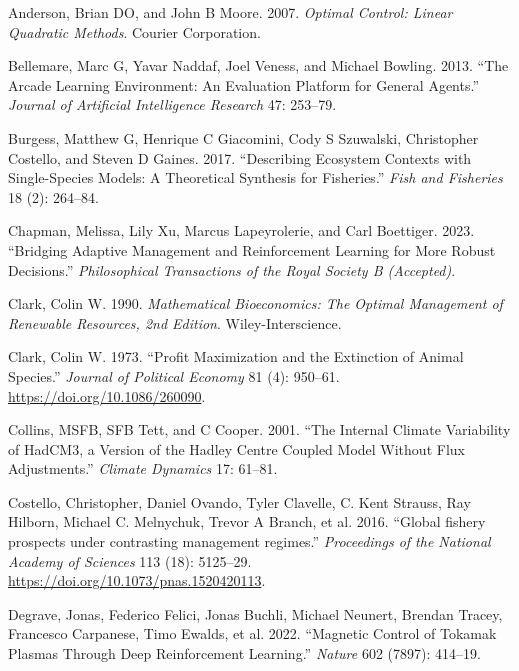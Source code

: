 \documentclass{article}
\newlength{\cslhangindent}
\newlength{\cslentryspacingunit} %
\newenvironment{CSLReferences}[2] %
 {%
  \setlength{\parindent}{0pt}
  \ifodd #1
  \let\oldpar\par
  \def\par{\hangindent=\cslhangindent\oldpar}
  \fi
  \setlength{\parskip}{#2\cslentryspacingunit}
 }%
 {}
\begin{document}
\hypertarget{refs}{}
\begin{CSLReferences}{1}{0}
\leavevmode{}%
Anderson, Brian DO, and John B Moore. 2007. \emph{Optimal Control:
Linear Quadratic Methods}. Courier Corporation.

\leavevmode{}%
Bellemare, Marc G, Yavar Naddaf, Joel Veness, and Michael Bowling. 2013.
{``The Arcade Learning Environment: An Evaluation Platform for General
Agents.''} \emph{Journal of Artificial Intelligence Research} 47:
253--79.

\leavevmode{}%
Burgess, Matthew G, Henrique C Giacomini, Cody S Szuwalski, Christopher
Costello, and Steven D Gaines. 2017. {``Describing Ecosystem Contexts
with Single-Species Models: A Theoretical Synthesis for Fisheries.''}
\emph{Fish and Fisheries} 18 (2): 264--84.

\leavevmode{}%
Chapman, Melissa, Lily Xu, Marcus Lapeyrolerie, and Carl Boettiger.
2023. {``Bridging Adaptive Management and Reinforcement Learning for
More Robust Decisions.''} \emph{Philosophical Transactions of the Royal
Society B (Accepted)}.

\leavevmode{}%
Clark, Colin W. 1990. \emph{{Mathematical Bioeconomics: The Optimal
Management of Renewable Resources, 2nd Edition}}. Wiley-Interscience.

\leavevmode{}%
Clark, Colin W. 1973. {``Profit Maximization and the Extinction of
Animal Species.''} \emph{Journal of Political Economy} 81 (4): 950--61.
\url{https://doi.org/10.1086/260090}.

\leavevmode{}%
Collins, MSFB, SFB Tett, and C Cooper. 2001. {``The Internal Climate
Variability of HadCM3, a Version of the Hadley Centre Coupled Model
Without Flux Adjustments.''} \emph{Climate Dynamics} 17: 61--81.

\leavevmode{}%
Costello, Christopher, Daniel Ovando, Tyler Clavelle, C. Kent Strauss,
Ray Hilborn, Michael C. Melnychuk, Trevor A Branch, et al. 2016.
{``{Global fishery prospects under contrasting management regimes}.''}
\emph{Proceedings of the National Academy of Sciences} 113 (18):
5125--29. \url{https://doi.org/10.1073/pnas.1520420113}.

\leavevmode{}%
Degrave, Jonas, Federico Felici, Jonas Buchli, Michael Neunert, Brendan
Tracey, Francesco Carpanese, Timo Ewalds, et al. 2022. {``Magnetic
Control of Tokamak Plasmas Through Deep Reinforcement Learning.''}
\emph{Nature} 602 (7897): 414--19.


\end{CSLReferences}
\end{document}
